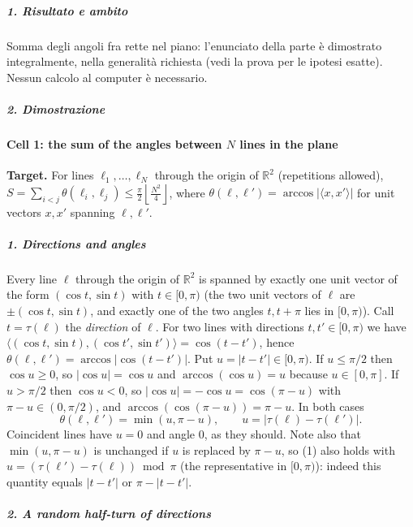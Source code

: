 \documentclass[11pt,a4paper]{article}
\begin{document}
\subparagraph{1. Risultato e ambito}\label{risultato-e-ambito}

Somma degli angoli fra rette nel piano: l'enunciato della parte è
dimostrato integralmente, nella generalità richiesta (vedi la prova per
le ipotesi esatte). Nessun calcolo al computer è necessario.

\subparagraph{2. Dimostrazione}\label{dimostrazione}

\paragraph{\texorpdfstring{Cell 1: the sum of the angles between \(N\)
lines in the
plane}{Cell 1: the sum of the angles between N lines in the plane}}\label{cell-1-the-sum-of-the-angles-between-n-lines-in-the-plane}

\textbf{Target.} For lines \(\ell_1,\dots,\ell_N\) through the origin of
\(\mathbb R^2\) (repetitions allowed),
\(S=\sum_{i<j}\theta(\ell_i,\ell_j)\le \frac{\pi}{2}\left\lfloor \frac{N^2}{4}\right\rfloor\),
where \(\theta(\ell,\ell')=\arccos|\langle x,x'\rangle|\) for unit
vectors \(x,x'\) spanning \(\ell,\ell'\).

\subparagraph{1. Directions and angles}\label{directions-and-angles}

Every line \(\ell\) through the origin of \(\mathbb R^2\) is spanned by
exactly one unit vector of the form \((\cos t,\sin t)\) with
\(t\in[0,\pi)\) (the two unit vectors of \(\ell\) are
\(\pm(\cos t,\sin t)\), and exactly one of the two angles \(t,t+\pi\)
lies in \([0,\pi)\)). Call \(t=\tau(\ell)\) the \emph{direction} of
\(\ell\). For two lines with directions \(t,t'\in[0,\pi)\) we have
\(\langle(\cos t,\sin t),(\cos t',\sin t')\rangle=\cos(t-t')\), hence
\(\theta(\ell,\ell')=\arccos|\cos(t-t')|\). Put \(u=|t-t'|\in[0,\pi)\).
If \(u\le\pi/2\) then \(\cos u\ge 0\), so \(|\cos u|=\cos u\) and
\(\arccos(\cos u)=u\) because \(u\in[0,\pi]\). If \(u>\pi/2\) then
\(\cos u<0\), so \(|\cos u|=-\cos u=\cos(\pi-u)\) with
\(\pi-u\in(0,\pi/2)\), and \(\arccos(\cos(\pi-u))=\pi-u\). In both cases
\[\theta(\ell,\ell')=\min(u,\pi-u),\qquad u=|\tau(\ell)-\tau(\ell')|.\tag{1}\]
Coincident lines have \(u=0\) and angle \(0\), as they should. Note also
that \(\min(u,\pi-u)\) is unchanged if \(u\) is replaced by \(\pi-u\),
so (1) also holds with \(u=(\tau(\ell')-\tau(\ell))\bmod\pi\) (the
representative in \([0,\pi)\)): indeed this quantity equals \(|t-t'|\)
or \(\pi-|t-t'|\).

\subparagraph{2. A random half-turn of
directions}\label{a-random-half-turn-of-directions}
\end{document}
